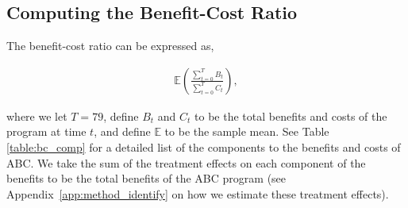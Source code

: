 

\subsection{Computing the Benefit-Cost Ratio}
\label{app:method_cbratio}

\noindent The benefit-cost ratio can be expressed as,

\begin{align}
\mathbb{E} \left( \frac{ \sum_{t=0}^T B_t}{\sum_{t=0}^T C_t} \right),
\end{align}

\noindent where we let $T = 79$, define $B_t$ and $C_t$ to be the total benefits and costs of the
program at time $t$, and define $\mathbb{E}$ to be the sample mean. See Table \ref{table:bc_comp} for a detailed list of the components
to the benefits and costs of ABC. We take the sum of the treatment effects on each component
of the benefits to be the total benefits of the ABC program (see Appendix~\ref{app:method_identify} on how we estimate these treatment effects). \\

